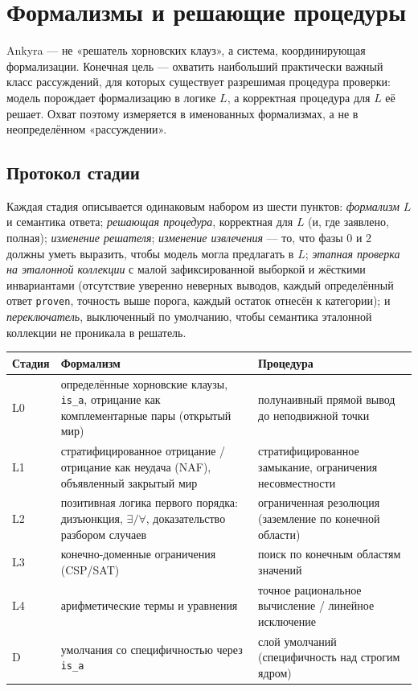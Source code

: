 \documentclass[11pt,a4paper]{article}
\begin{document}
\section{Формализмы и решающие процедуры}
\label{sec:formalisms}

Ankyra — не «решатель хорновских клауз», а система, координирующая формализации. Конечная цель — охватить наибольший практически
важный класс рассуждений, для которых существует разрешимая процедура проверки: модель порождает формализацию в логике $L$,
а корректная процедура для $L$ её решает. Охват поэтому измеряется в именованных формализмах, а не в неопределённом «рассуждении».

\subsection{Протокол стадии}

Каждая стадия описывается одинаковым набором из шести пунктов: \emph{формализм} $L$ и семантика ответа; \emph{решающая процедура},
корректная для $L$ (и, где заявлено, полная); \emph{изменение решателя}; \emph{изменение извлечения} — то, что фазы 0 и 2 должны
уметь выразить, чтобы модель могла предлагать в $L$; \emph{этапная проверка на эталонной коллекции} с малой зафиксированной выборкой
и жёсткими инвариантами (отсутствие уверенно неверных выводов, каждый определённый ответ \texttt{proven}, точность выше порога,
каждый остаток отнесён к категории); и \emph{переключатель}, выключенный по умолчанию, чтобы семантика эталонной коллекции не
проникала в решатель.

\begin{center}
\begin{tabular}{p{0.8cm}p{5.6cm}p{5.4cm}}
\toprule
\textbf{Стадия} & \textbf{Формализм} & \textbf{Процедура} \\
\midrule
L0 & определённые хорновские клаузы, \texttt{is\_a}, отрицание как комплементарные пары (открытый мир) & полунаивный прямой вывод до неподвижной точки \\
L1 & стратифицированное отрицание / отрицание как неудача (NAF), объявленный закрытый мир & стратифицированное замыкание, ограничения несовместности \\
L2 & позитивная логика первого порядка: дизъюнкция, $\exists/\forall$, доказательство разбором случаев & ограниченная резолюция (заземление по конечной области) \\
L3 & конечно-доменные ограничения (CSP/SAT) & поиск по конечным областям значений \\
L4 & арифметические термы и уравнения & точное рациональное вычисление / линейное исключение \\
D  & умолчания со специфичностью через \texttt{is\_a} & слой умолчаний (специфичность над строгим ядром) \\
\bottomrule
\end{tabular}
\end{center}
\end{document}
